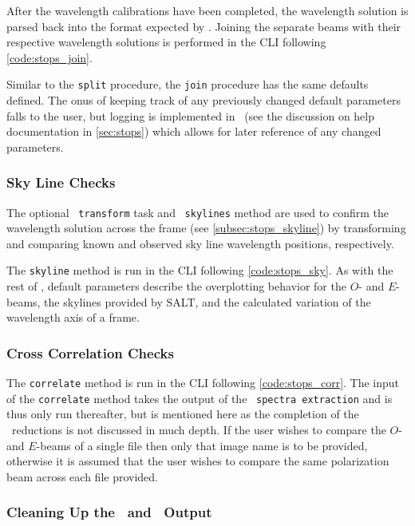 After the wavelength calibrations have been completed, the wavelength solution is parsed back into the format expected by \polsalt. Joining the separate beams with their respective wavelength solutions is performed in the \gls{CLI} following \autoref{code:stops_join}.

Similar to the \texttt{split} procedure, the \texttt{join} procedure has the same defaults defined. The onus of keeping track of any previously changed default parameters falls to the user, but logging is implemented in \stops\ (see the discussion on help documentation in \autoref{sec:stops}) which allows for later reference of any changed parameters.

\subsubsection{Sky Line Checks} \label{subsec:reduc_sky}

The optional \iraf\ \texttt{transform} task and \stops\ \texttt{skylines} method are used to confirm the wavelength solution across the frame (see \autoref{subsec:stops_skyline}) by transforming and comparing known and observed sky line wavelength positions, respectively.

The \texttt{skyline} method is run in the \gls{CLI} following \autoref{code:stops_sky}. As with the rest of \stops, default parameters describe the overplotting behavior for the $O$- and $E$-beams, the skylines provided by \gls{SALT}, and the calculated variation of the wavelength axis of a frame.

\subsubsection{Cross Correlation Checks} \label{subsec:reduc_corr}

The \texttt{correlate} method is run in the \gls{CLI} following \autoref{code:stops_corr}. The input of the \texttt{correlate} method takes the output of the \polsalt\ \texttt{spectra extraction} and is thus only run thereafter, but is mentioned here as the completion of the \polsalt\ reductions is not discussed in much depth. If the user wishes to compare the $O$- and $E$-beams of a single file then only that image name is to be provided, otherwise it is assumed that the user wishes to compare the same polarization beam across each file provided.

\subsubsection{Cleaning Up the \iraf\ and \stops\ Output}

